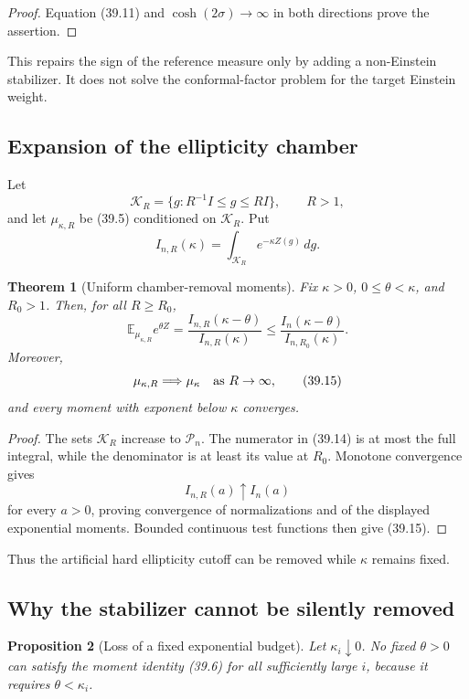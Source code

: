 \documentclass[11pt]{article}
\newtheorem{theorem}{Theorem}[section]
\newtheorem{proposition}[theorem]{Proposition}
\begin{document}
\begin{proof}
Equation (39.11) and
\(\cosh(2\sigma)\to\infty\) in both directions prove the assertion.
\end{proof}

This repairs the sign of the reference measure only by adding a
non-Einstein stabilizer.  It does not solve the conformal-factor problem
for the target Einstein weight.

\subsection{Expansion of the ellipticity chamber}

Let
\[
 \mathcal K_R
 =
 \{g:R^{-1}I\leq g\leq RI\},
 \qquad R>1,
 \tag{39.12}
\]
and let \(\mu_{\kappa,R}\) be (39.5) conditioned on
\(\mathcal K_R\).  Put
\[
 I_{n,R}(\kappa)
 =
 \int_{\mathcal K_R}e^{-\kappa Z(g)}\,dg.
 \tag{39.13}
\]

\begin{theorem}[Uniform chamber-removal moments]
\label{thm:v11v39-chamber}
Fix \(\kappa>0\), \(0\leq\theta<\kappa\), and \(R_0>1\).  Then, for
all \(R\geq R_0\),
\[
 \mathbb E_{\mu_{\kappa,R}}e^{\theta Z}
 =
 \frac{I_{n,R}(\kappa-\theta)}{I_{n,R}(\kappa)}
 \leq
 \frac{I_n(\kappa-\theta)}
      {I_{n,R_0}(\kappa)}.
 \tag{39.14}
\]
Moreover,
\[
 \mu_{\kappa,R}\Longrightarrow\mu_\kappa
 \quad\hbox{as }R\to\infty,
 \tag{39.15}
\]
and every moment with exponent below \(\kappa\) converges.
\end{theorem}

\begin{proof}
The sets \(\mathcal K_R\) increase to \(\mathcal P_n\).
The numerator in (39.14) is at most the full integral, while the
denominator is at least its value at \(R_0\).  Monotone convergence gives
\[
 I_{n,R}(a)\uparrow I_n(a)
\]
for every \(a>0\), proving convergence of normalizations and of the
displayed exponential moments.  Bounded continuous test functions then
give (39.15).
\end{proof}

Thus the artificial hard ellipticity cutoff can be removed while
\(\kappa\) remains fixed.

\subsection{Why the stabilizer cannot be silently removed}

\begin{proposition}[Loss of a fixed exponential budget]
\label{prop:v11v39-kappa}
Let \(\kappa_i\downarrow0\).  No fixed \(\theta>0\) can satisfy the
moment identity (39.6) for all sufficiently large \(i\), because it
requires \(\theta<\kappa_i\).
\end{proposition}
\end{document}
